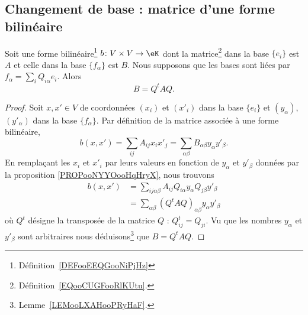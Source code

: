 \subsection{Changement de base : matrice d'une forme bilinéaire}

\begin{proposition}     \label{PROPooLBIOooUpzxXA}
    Soit une forme bilinéaire\footnote{Définition~\ref{DEFooEEQGooNiPjHz}} \( b\colon V\times V\to \eK\) dont la matrice\footnote{Définition~\ref{EQooCUGFooRlKUtu}.} dans la base \( \{ e_i \}\) est \( A\) et celle dans la base \( \{ f_{\alpha} \}\) est \( B\). Nous supposons que les bases sont liées par \( f_{\alpha}=\sum_{i}Q_{i\alpha}e_i\). Alors
\begin{equation}        \label{EQooZUVTooKjqnJj}
    B=Q^tAQ.
\end{equation}
\end{proposition}

\begin{proof}
    Soit \( x,x'\in V\) de coordonnées \( (x_i)\) et \( (x'_i)\) dans la base \( \{ e_i \}\) et \( (y_{\alpha})\), \( (y'_{\alpha})\) dans la base \( \{ f_{\alpha} \}\). Par définition de la matrice associée à une forme bilinéaire,
    \begin{equation}
        b(x,x')=\sum_{ij}A_{ij}x_ix'_j=\sum_{\alpha\beta}B_{\alpha\beta}y_{\alpha}y'_{\beta}.
    \end{equation}
    En remplaçant les \( x_i\) et \( x'_i\) par leurs valeurs en fonction de \( y_{\alpha}\) et \( y'_{\beta}\) données par la proposition \ref{PROPooNYYOooHqHryX}, nous trouvons
    \begin{subequations}
        \begin{align}
            b(x,x')&=\sum_{ij\alpha\beta}A_{ij}Q_{i\alpha}y_{\alpha}Q_{j\beta}y'_{\beta}\\
            &=\sum_{\alpha\beta}(Q^tAQ)_{\alpha\beta}y_{\alpha}y'_{\beta}
        \end{align}
    \end{subequations}
    où \( Q^t\) désigne la transposée de la matrice \( Q\) :  \( Q^t_{ij}=Q_{ji}\). Vu que les nombres \( y_{\alpha}\) et \( y'_{\beta}\) sont arbitraires nous déduisons\footnote{Lemme~\ref{LEMooLXAHooPRyHaF}.} que \( B=Q^tAQ\).
\end{proof}

